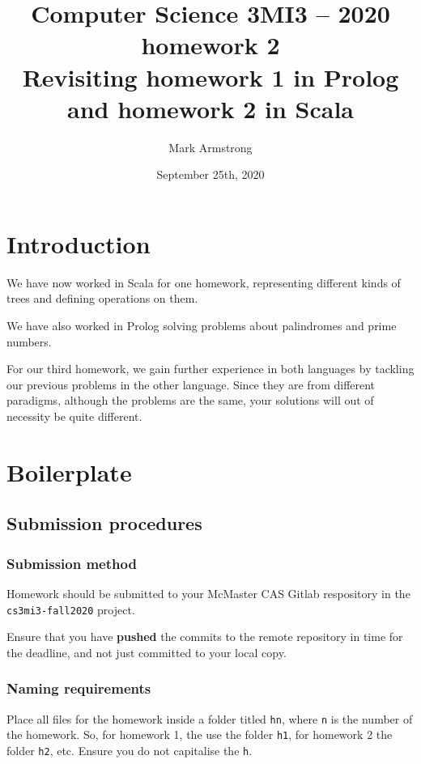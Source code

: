 \documentclass[11pt]{article}
\author{Mark Armstrong}
\date{September 25th, 2020}
\title{Computer Science 3MI3 – 2020 homework 2\\\medskip
\large Revisiting homework 1 in Prolog and homework 2 in Scala}
\begin{document}
\maketitle
\tableofcontents


\section*{Introduction}
\label{sec:org7fa5c8a}
We have now worked in Scala for one homework,
representing different kinds of trees
and defining operations on them.

We have also worked in Prolog solving problems
about palindromes and prime numbers.

For our third homework, we gain further experience
in both languages by tackling our previous problems
in the other language.
Since they are from different paradigms,
although the problems are the same,
your solutions will out of necessity be quite different.

\section*{Boilerplate}
\label{sec:org8b413c3}
\subsection*{Submission procedures}
\label{sec:orgbf7150b}
\subsubsection*{Submission method}
\label{sec:org3ff8d40}

Homework should be submitted to your McMaster CAS Gitlab respository
in the \texttt{cs3mi3-fall2020} project.

Ensure that you have \textbf{pushed} the commits to the remote repository
in time for the deadline, and not just committed to your local copy.

\subsubsection*{Naming requirements}
\label{sec:orge4bfa36}

Place all files for the homework
inside a folder titled \texttt{hn}, where \texttt{n} is the number of the homework.
So, for homework 1, the use the folder \texttt{h1}, for homework 2 the folder \texttt{h2}, etc.
Ensure you do not capitalise the \texttt{h}.
\end{document}
